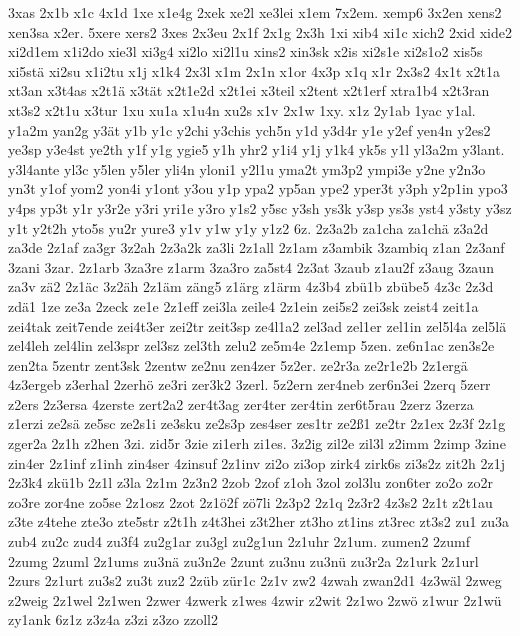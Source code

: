 {3xas
2x1b
x1c
4x1d
1xe
x1e4g
2xek
xe2l
xe3lei
x1em
7x2em.
xemp6
3x2en
xens2
xen3sa
x2er.
5xere
xers2
3xes
2x3eu
2x1f
2x1g
2x3h
1xi
xib4
xi1c
xich2
2xid
xide2
xi2d1em
x1i2do
xie3l
xi3g4
xi2lo
xi2l1u
xins2
xin3sk
x2is
xi2s1e
xi2s1o2
xis5s
xi5stä
xi2su
x1i2tu
x1j
x1k4
2x3l
x1m
2x1n
x1or
4x3p
x1q
x1r
2x3s2
4x1t
x2t1a
xt3an
x3t4as
x2t1ä
x3tät
x2t1e2d
x2t1ei
x3teil
x2tent
x2t1erf
xtra1b4
x2t3ran
xt3s2
x2t1u
x3tur
1xu
xu1a
x1u4n
xu2s
x1v
2x1w
1xy.
x1z
2y1ab
1yac
y1al.
y1a2m
yan2g
y3ät
y1b
y1c
y2chi
y3chis
ych5n
y1d
y3d4r
y1e
y2ef
yen4n
y2es2
ye3sp
y3e4st
ye2th
y1f
y1g
ygie5
y1h
yhr2
y1i4
y1j
y1k4
yk5s
y1l
yl3a2m
y3lant.
y3l4ante
yl3c
y5len
y5ler
yli4n
yloni1
y2l1u
yma2t
ym3p2
ympi3e
y2ne
y2n3o
yn3t
y1of
yom2
yon4i
y1ont
y3ou
y1p
ypa2
yp5an
ype2
yper3t
y3ph
y2p1in
ypo3
y4ps
yp3t
y1r
y3r2e
y3ri
yri1e
y3ro
y1s2
y5sc
y3sh
ys3k
y3sp
ys3s
yst4
y3sty
y3sz
y1t
y2t2h
yto5s
yu2r
yure3
y1v
y1w
y1y
y1z2
6z.
2z3a2b
za1cha
za1chä
z3a2d
za3de
2z1af
za3gr
3z2ah
2z3a2k
za3li
2z1all
2z1am
z3ambik
3zambiq
z1an
2z3anf
3zani
3zar.
2z1arb
3za3re
z1arm
3za3ro
za5st4
2z3at
3zaub
z1au2f
z3aug
3zaun
za3v
zä2
2z1äc
3z2äh
2z1äm
zäng5
z1ärg
z1ärm
4z3b4
zbü1b
zbübe5
4z3c
2z3d
zdä1
1ze
ze3a
2zeck
ze1e
2z1eff
zei3la
zeile4
2z1ein
zei5s2
zei3sk
zeist4
zeit1a
zei4tak
zeit7ende
zei4t3er
zei2tr
zeit3sp
ze4l1a2
zel3ad
zel1er
zel1in
zel5l4a
zel5lä
zel4leh
zel4lin
zel3spr
zel3sz
zel3th
zelu2
ze5m4e
2z1emp
5zen.
ze6n1ac
zen3s2e
zen2ta
5zentr
zent3sk
2zentw
ze2nu
zen4zer
5z2er.
ze2r3a
ze2r1e2b
2z1ergä
4z3ergeb
z3erhal
2zerhö
ze3ri
zer3k2
3zerl.
5z2ern
zer4neb
zer6n3ei
2zerq
5zerr
z2ers
2z3ersa
4zerste
zert2a2
zer4t3ag
zer4ter
zer4tin
zer6t5rau
2zerz
3zerza
z1erzi
ze2sä
ze5sc
ze2s1i
ze3sku
ze2s3p
zes4ser
zes1tr
ze2ß1
ze2tr
2z1ex
2z3f
2z1g
zger2a
2z1h
z2hen
3zi.
zid5r
3zie
zi1erh
zi1es.
3z2ig
zil2e
zil3l
z2imm
2zimp
3zine
zin4er
2z1inf
z1inh
zin4ser
4zinsuf
2z1inv
zi2o
zi3op
zirk4
zirk6s
zi3s2z
zit2h
2z1j
2z3k4
zkü1b
2z1l
z3la
2z1m
2z3n2
2zob
2zof
z1oh
3zol
zol3lu
zon6ter
zo2o
zo2r
zo3re
zor4ne
zo5se
2z1osz
2zot
2z1ö2f
zö7li
2z3p2
2z1q
2z3r2
4z3s2
2z1t
z2t1au
z3te
z4tehe
zte3o
zte5str
z2t1h
z4t3hei
z3t2her
zt3ho
zt1ins
zt3rec
zt3s2
zu1
zu3a
zub4
zu2c
zud4
zu3f4
zu2g1ar
zu3gl
zu2g1un
2z1uhr
2z1um.
zumen2
2zumf
2zumg
2zuml
2z1ums
zu3nä
zu3n2e
2zunt
zu3nu
zu3nü
zu3r2a
2z1urk
2z1url
2zurs
2z1urt
zu3s2
zu3t
zuz2
2züb
zür1c
2z1v
zw2
4zwah
zwan2d1
4z3wäl
2zweg
z2weig
2z1wel
2z1wen
2zwer
4zwerk
z1wes
4zwir
z2wit
2z1wo
2zwö
z1wur
2z1wü
zy1ank
6z1z
z3z4a
z3zi
z3zo
zzoll2
}

